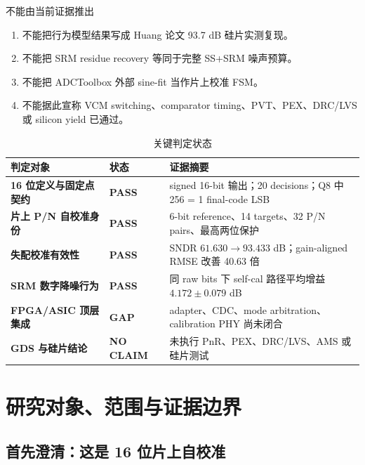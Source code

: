 \documentclass[UTF8,fontset=none,a4paper,11pt,openany]{ctexrep}
\newcommand{\statuspass}{\textcolor{RefGreen}{\textbf{PASS}}}
\newcommand{\statusgap}{\textcolor{RefOrange}{\textbf{GAP}}}
\newcommand{\statusnoclaim}{\textcolor{RefGray}{\textbf{NO CLAIM}}}
\begin{document}
\begin{riskbox}{不能由当前证据推出}
\begin{enumerate}
  \item 不能把行为模型结果写成 Huang 论文 93.7 dB 硅片实测复现。
  \item 不能把 SRM residue recovery 等同于完整 SS+SRM 噪声预算。
  \item 不能把 ADCToolbox 外部 sine-fit 当作片上校准 FSM。
  \item 不能据此宣称 VCM switching、comparator timing、PVT、PEX、DRC/LVS 或 silicon yield 已通过。
\end{enumerate}
\end{riskbox}

\begin{table}[H]
\centering
\caption{关键判定状态}
\label{tab:executive-status}
\begin{tabularx}{\textwidth}{>{\bfseries}p{}p{}X}
\toprule
判定对象 & 状态 & 证据摘要\\
\midrule
16 位定义与固定点契约 & \statuspass & signed 16-bit 输出；20 decisions；Q8 中 256 = 1 final-code LSB\\
片上 P/N 自校准身份 & \statuspass & 6-bit reference、14 targets、32 P/N pairs、最高两位保护\\
失配校准有效性 & \statuspass & SNDR $61.630\rightarrow93.433$ dB；gain-aligned RMSE 改善 40.63 倍\\
SRM 数字降噪行为 & \statuspass & 同 raw bits 下 self-cal 路径平均增益 $4.172\pm0.079$ dB\\
FPGA/ASIC 顶层集成 & \statusgap & adapter、CDC、mode arbitration、calibration PHY 尚未闭合\\
GDS 与硅片结论 & \statusnoclaim & 未执行 PnR、PEX、DRC/LVS、AMS 或硅片测试\\
\bottomrule
\end{tabularx}
\end{table}

\clearpage
\tableofcontents
\clearpage
\listoffigures
\clearpage
\listoftables
\clearpage
{}

\chapter{研究对象、范围与证据边界}

\section{首先澄清：这是 16 位片上自校准}
\end{document}
